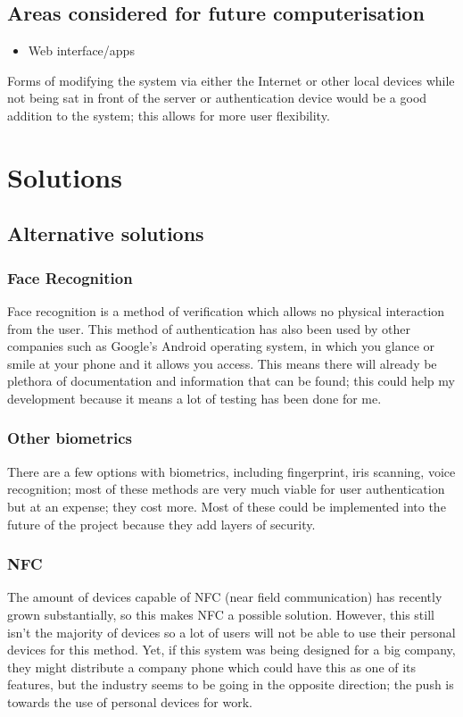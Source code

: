 \documentclass[12pt,a4paper]{report}
\begin{document}
\subsection{Areas considered for future 
computerisation}\label{section:_Toc370402532}
\begin{itemize}
\item Web interface/apps
\end{itemize}
Forms of modifying the system via either the Internet or other local 
devices while not being sat in front of the server or authentication 
device would be a good addition to the system; this allows for more user 
flexibility.



\section{Solutions}\label{section:_Toc370402533}
\subsection{Alternative solutions}\label{section:_Toc370402534}
\subsubsection{Face Recognition}\label{section:_Toc370402535}
Face recognition is a method of verification which allows no physical 
interaction from the user. This method of authentication has also been 
used by other companies such as Google's Android operating system, in 
which you glance or smile at your phone and it allows you access. This 
means there will already be plethora of documentation and information 
that can be found; this could help my development because it means a lot 
of testing has been done for me.

\subsubsection{Other biometrics}\label{section:_Toc370402536}
There are a few options with biometrics, including fingerprint, iris 
scanning, voice recognition; most of these methods are very much viable 
for user authentication but at an expense; they cost more. Most of these 
could be implemented into the future of the project because they add 
layers of security.

\subsubsection{NFC}\label{section:_Toc370402537}
The amount of devices capable of NFC (near field communication) has 
recently grown substantially, so this makes NFC a possible solution. 
However, this still isn't the majority of devices so a lot of users will 
not be able to use their personal devices for this method. Yet, if this 
system was being designed for a big company, they might distribute a 
company phone which could have this as one of its features, but the 
industry seems to be going in the opposite direction; the push is 
towards the use of personal devices for work.
\end{document}
